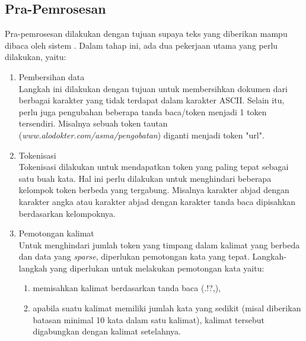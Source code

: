 	\subsection{Pra-Pemrosesan}
	Pra-pemrosesan dilakukan dengan tujuan supaya teks yang diberikan mampu dibaca oleh sistem \mer. Dalam tahap ini, ada dua pekerjaan utama yang perlu dilakukan, yaitu:
	\begin{enumerate}
		\item Pembersihan data\\
		Langkah ini dilakukan dengan tujuan untuk membersihkan dokumen dari berbagai karakter yang tidak terdapat dalam karakter ASCII. Selain itu, perlu juga pengubahan beberapa tanda baca/token menjadi 1 token tersendiri. Misalnya sebuah token tautan (\textit{www.alodokter.com/asma/pengobatan}) diganti menjadi token "url".
		\item Tokenisasi\\
		Tokenisasi dilakukan untuk mendapatkan token yang paling tepat sebagai satu buah kata. Hal ini perlu dilakukan untuk menghindari beberapa kelompok token berbeda yang tergabung. Misalnya karakter abjad dengan karakter angka atau karakter abjad dengan karakter tanda baca dipisahkan berdasarkan kelompoknya.
		\item Pemotongan kalimat\\
		Untuk menghindari jumlah token yang timpang dalam kalimat yang berbeda dan data yang \textit{sparse}, diperlukan pemotongan kata yang tepat. Langkah-langkah yang diperlukan untuk melakukan pemotongan kata yaitu:
		\begin{enumerate}
			\item memisahkan kalimat berdasarkan tanda baca (.!?,),
			\item apabila suatu kalimat memiliki jumlah kata yang sedikit (misal diberikan batasan minimal 10 kata dalam satu kalimat), kalimat tersebut digabungkan dengan kalimat setelahnya.
		\end{enumerate}
	\end{enumerate}
	

